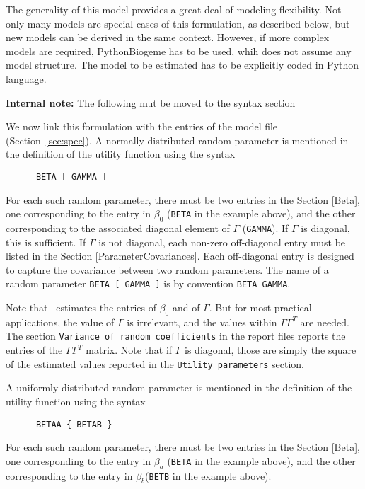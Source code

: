 \documentclass[12pt]{memoir}
\newcommand{\note}[1]{
\begin{framed}{}%
\textbf{\underline{Internal note}:} #1
\end{framed}}
\begin{document}
    The generality of this model provides a great deal of modeling
      flexibility. Not only many models are special cases of this
      formulation, as described below, but new models can be derived in the
      same context. However, if more complex models are required,
      PythonBiogeme has to be used, whih does not assume any model
      structure. The model to be estimated has to be explicitly coded
      in Python language. 

\note{The following mut be moved to the syntax section}
      We now link this formulation with the entries of the model file
      (Section~\ref{sec:spec}). 
      A normally distributed random parameter is mentioned in the definition of the utility
      function using the syntax
      \begin{verbatim}
      BETA [ GAMMA ]
      \end{verbatim}
      For each such random parameter, there must    be two entries in the Section [Beta], one
      corresponding to the entry in $\beta_0$ (\verb+BETA+ in the example above), and the other corresponding
      to the associated diagonal element of $\Gamma$ (\verb+GAMMA+). If
      $\Gamma$ is diagonal, this is sufficient.
      If $\Gamma$ is not diagonal, each non-zero off-diagonal entry must be
      listed in the Section
        [ParameterCovariances]. Each off-diagonal entry is designed to
      capture the covariance between two random parameters. The name of a
      random parameter \verb+BETA [ GAMMA ]+ is by convention
      \verb+BETA_GAMMA+.

      Note that \BIOGEME\ estimates the entries of $\beta_0$ and of
      $\Gamma$. But for most practical applications, the value of $\Gamma$
      is irrelevant, and the values within  $\Gamma \Gamma^T$ are needed.  The
      section \verb+Variance of random coefficients+ in the report files
      reports the entries of the $\Gamma \Gamma^T$ matrix. Note that if
      $\Gamma$ is diagonal, those are simply the square of the estimated
      values reported in the \verb+Utility parameters+ section.

      A uniformly distributed random parameter is mentioned in the definition of the utility
      function using the syntax
      \begin{verbatim}
      BETAA { BETAB }
      \end{verbatim}
      For each such random parameter, there must
      be two entries in the Section [Beta], one
      corresponding to the entry in $\beta_a$ (\verb+BETA+ in the
example above), and the other corresponding to the entry in $\beta_b$(\verb+BETB+ in the
example above).
\end{document}
